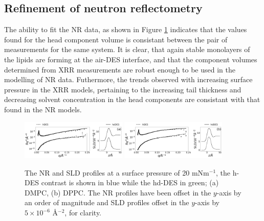 \documentclass[twoside,twocolumn,9pt]{article}
\begin{document}
\subsection{Refinement of neutron reflectometry}
The ability to fit the NR data, as shown in Figure \ref{fig:neutron} indicates that the values found for the head component volume is consistant between the pair of measurements for the same system. It is clear, that again stable monolayers of the lipids are forming at the air-DES interface, and that the component volumes determined from XRR measurements are robust enough to be used in the modelling of NR data. Futhermore, the trends observed with increasing surface pressure in the XRR models, pertaining to the increasing tail thickness and decreasing solvent concentration in the head components are consistant with that found in the NR models.
%
\begin{figure}
	\centering
	\includegraphics[width=0.45\textwidth]{figures/dmpc_20n_ref_sld}
	\includegraphics[width=0.45\textwidth]{figures/dppc_20n_ref_sld}
	\caption{The NR and SLD profiles at a surface pressure of 20 mNm$^{-1}$, the h-DES contrast is shown in blue while the hd-DES in green; (a) DMPC, (b) DPPC. The NR profiles have been offset in the $y$-axis by an order of magnitude and SLD profiles offset in the $y$-axis by $5\times10^{-6}$ \AA$^{-2}$, for clarity.}
	\label{fig:neutron}
\end{figure}
%
\end{document}
